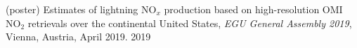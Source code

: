 \begin{cvpublications}
\publication
{(poster) Estimates of lightning NO$_x$ production based on high-resolution OMI NO$_2$ retrievals over the continental United States,
\emph{EGU General Assembly 2019},
Vienna, Austria, April 2019.} %
{2019} %

\end{cvpublications}
